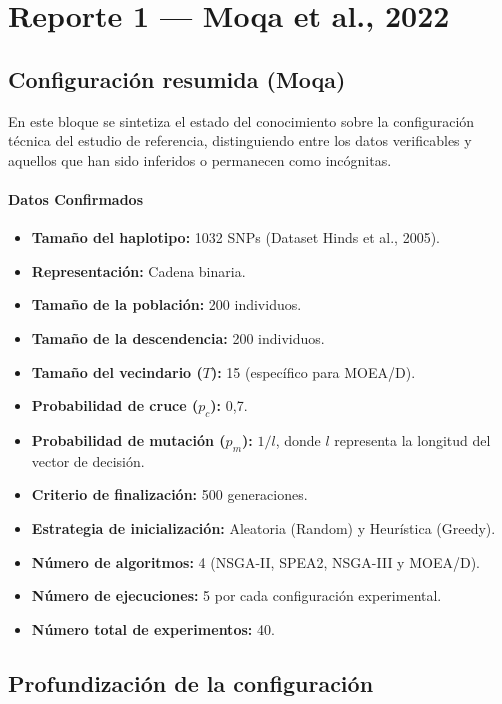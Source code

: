 \documentclass[a4paper,10pt]{article}
\begin{document}
\newpage
{
\setlength{\parskip}{0pt}
\tableofcontents
}

\section{Reporte 1 — Moqa et al., 2022}
\subsection{Configuración resumida (Moqa)}
En este bloque se sintetiza el estado del conocimiento sobre la configuración técnica del estudio de referencia, distinguiendo entre los datos verificables y aquellos que han sido inferidos o permanecen como incógnitas.


 \paragraph{Datos Confirmados}
 \begin{itemize}
     \item \textbf{Tamaño del haplotipo:} 1032 SNPs (Dataset Hinds et al., 2005).
     \item \textbf{Representación:} Cadena binaria.
     \item \textbf{Tamaño de la población:} 200 individuos.
     \item \textbf{Tamaño de la descendencia:} 200 individuos.
     \item \textbf{Tamaño del vecindario ($T$):} 15 (específico para MOEA/D).
     \item \textbf{Probabilidad de cruce ($p_c$):} 0,7.
     \item \textbf{Probabilidad de mutación ($p_m$):} $1/l$, donde $l$ representa la longitud del vector de decisión.
     \item \textbf{Criterio de finalización:} 500 generaciones.
     \item \textbf{Estrategia de inicialización:} Aleatoria (Random) y Heurística (Greedy).
     \item \textbf{Número de algoritmos:} 4 (NSGA-II, SPEA2, NSGA-III y MOEA/D).
     \item \textbf{Número de ejecuciones:} 5 por cada configuración experimental.
     \item \textbf{Número total de experimentos:} 40.
 \end{itemize}


\subsection{Profundización de la configuración}
\label{sec:marco_repro_moqa}
\end{document}
